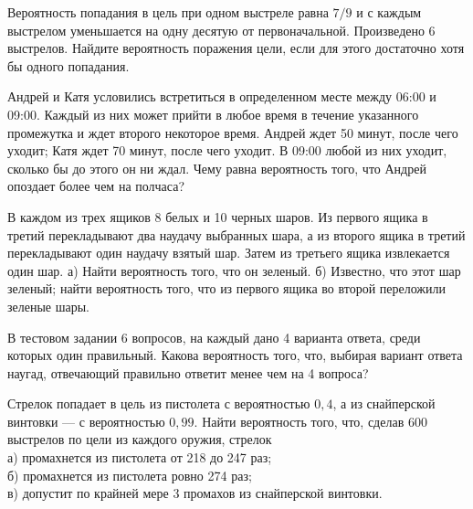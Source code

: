 \documentclass[12pt,a4paper,%
]{scrartcl}
\begin{document}
\vfill\newpage\setcounter{zad}{0}






\begin{zkrW}{20}\noindent Вероятность попадания в цель при одном выстреле равна $7/9$ и с каждым выстрелом уменьшается на одну десятую от первоначальной. Произведено 6 выстрелов. Найдите вероятность поражения цели, если для этого достаточно хотя бы одного попадания.
 \end{zkrW}

\vfill


\begin{zkrW}{20}\noindent Андрей и Катя условились встретиться в определенном месте между 06:00 и 09:00. Каждый из них может прийти в любое время в течение указанного промежутка и ждет второго некоторое время. Андрей ждет 50 минут, после чего уходит; Катя ждет 70 минут, после чего уходит. В 09:00 любой из них уходит, сколько бы до этого он ни ждал. Чему равна вероятность того, что Андрей опоздает более чем на полчаса?
 \end{zkrW}

\vfill


\begin{zkrW}{20}\noindent В каждом из трех ящиков 8 белых и 10 черных шаров. Из первого ящика в третий перекладывают два наудачу выбранных шара, а из второго ящика в третий перекладывают один наудачу взятый шар. Затем из третьего ящика извлекается один шар. а) Найти вероятность того, что он зеленый. б) Известно, что этот шар зеленый; найти вероятность того, что из первого ящика во второй переложили зеленые шары.
 \end{zkrW}

\vfill



\begin{zkrW}{20}\noindent В тестовом задании 6 вопросов, на каждый дано 4 варианта ответа, среди которых один правильный. Какова вероятность того, что, выбирая вариант ответа наугад, отвечающий правильно ответит менее чем на 4 вопроса?
 \end{zkrW}

\vfill



\begin{zkrW}{20}\noindent Стрелок попадает в цель из пистолета с вероятностью $0{,}4$, а из снайперской винтовки --- с вероятностью $0{,}99$. Найти вероятность того, что, сделав 600 выстрелов по цели из каждого оружия, стрелок \\ \indent а) промахнется из пистолета от 218 до 247 раз; \\ \indent б) промахнется из пистолета ровно 274 раз; \\ \indent в) допустит по крайней мере 3 промахов из снайперской винтовки.
 \end{zkrW}
\end{document}
